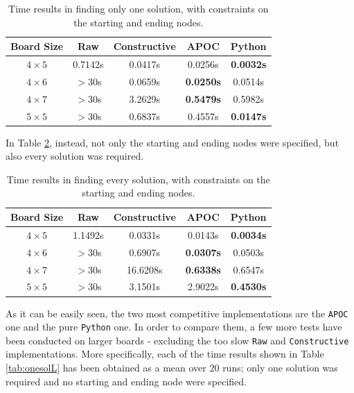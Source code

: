 \documentclass[conference]{IEEEtran}
\begin{document}
\begin{table}[ht]
\centering
\begin{tabular}{|c|c c c c |}
\hline
\textbf{Board Size} & \textbf{Raw} & \textbf{Constructive} & \textbf{APOC} & \textbf{Python} \\ \hline
\textbf{$4 \times 5$} & 0.7142s & 0.0417s & 0.0256s & \textbf{0.0032s}  \\ \hline
\textbf{$4 \times 6$} & $>$30s & 0.0659s & \textbf{0.0250s} & 0.0514s \\ \hline
\textbf{$4 \times 7$} & $>$30s & 3.2629s & \textbf{0.5479s} & 0.5982s \\ \hline
\textbf{$5 \times 5$} & $>$30s & 0.6837s & 0.4557s & \textbf{0.0147s} \\ \hline
\end{tabular}
\caption{Time results in finding only one solution, with constraints on the starting and ending nodes.}
\label{tab:onesolcon}
\end{table}

In Table \ref{tab:solscon}, instead, not only the starting and ending nodes were specified, but also every solution was required.

\begin{table}[ht]
\centering
\begin{tabular}{|c|c c c c |}
\hline
\textbf{Board Size} & \textbf{Raw} & \textbf{Constructive} & \textbf{APOC} & \textbf{Python} \\ \hline
\textbf{$4 \times 5$} & 1.1492s & 0.0331s & 0.0143s & \textbf{0.0034s} \\ \hline
\textbf{$4 \times 6$} & $>$30s & 0.6907s & \textbf{0.0307s} & 0.0503s \\ \hline
\textbf{$4 \times 7$} & $>$30s & 16.6208s & \textbf{0.6338s} & 0.6547s \\ \hline
\textbf{$5 \times 5$} & $>$30s & 3.1501s & 2.9022s & \textbf{0.4530s} \\ \hline
\end{tabular}
\caption{Time results in finding every solution, with constraints on the starting and ending nodes.}
\label{tab:solscon}
\end{table}

As it can be easily seen, the two most competitive implementations are the \texttt{APOC} one and the pure \texttt{Python} one.
In order to compare them, a few more tests have been conducted on larger boards - excluding the too slow \texttt{Raw} and \texttt{Constructive} implementations.
More specifically, each of the time results shown in Table \ref{tab:onesolL} has been obtained as a mean over $20$ runs; only one solution was required and no starting and ending node were specified.
\end{document}
